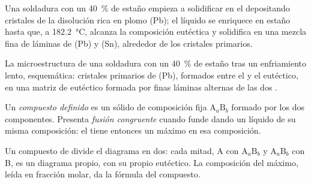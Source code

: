 Una soldadura con un 40~\% de estaño empieza a solidificar en el  depositando cristales de
la disolución rica en plomo (Pb); el líquido se enriquece en estaño hasta que, a
\qty{182.2}{\degreeCelsius}, alcanza la composición eutéctica y solidifica en
una mezcla fina de láminas de (Pb) y (Sn), alrededor de los cristales primarios.

\begin{omfigure}

{\small La microestructura de una soldadura con un 40~\% de estaño tras un enfriamiento lento, esquemática:
cristales primarios de (Pb), formados entre el  y el eutéctico, en una
matriz de eutéctico formada por finas láminas alternas de las dos .}
\end{omfigure}

\begin{definition}\label{def:b2:solid-liquid-diagrams:defined-compound}
Un \emph{compuesto definido} es un sólido de
composición fija $\mathrm{A}_a\mathrm{B}_b$ formado por los dos componentes. Presenta
\emph{fusión congruente} cuando funde dando un líquido de
su misma composición: el  tiene entonces un máximo en esa composición.
\end{definition}

Un compuesto de  divide el diagrama en dos: cada mitad, A con
$\mathrm{A}_a\mathrm{B}_b$ y $\mathrm{A}_a\mathrm{B}_b$ con B, es un diagrama
propio, con su propio eutéctico. La composición del máximo, leída en fracción
molar, da la fórmula del compuesto.

